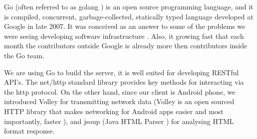 Go (often referred to as golang \parencite{google.golang.2016}) is an open source programming language, and it is compiled, concurrent, garbage-collected, statically typed language developed at Google in late 2007. It was conceived as an answer to some of the problems we were seeing developing software infrastructure \parencite{google.talk-golang.2012}. Also, it growing fast that each month the contributors outside Google is already more then contributors inside the Go team. 

We are using Go to build the server, it is well suited for developing RESTful API’s. The net/http standard library provides key methods for interacting via the http protocol. On the other hand, since our client is Android phone, we introduced Volley for transmitting network data (Volley is an open sourced HTTP library that makes networking for Android apps easier and most importantly, faster \parencite{google.volley.2016}), and jsoup (Java HTML Parser \parencite{joup.2016}) for analysing HTML format response.

